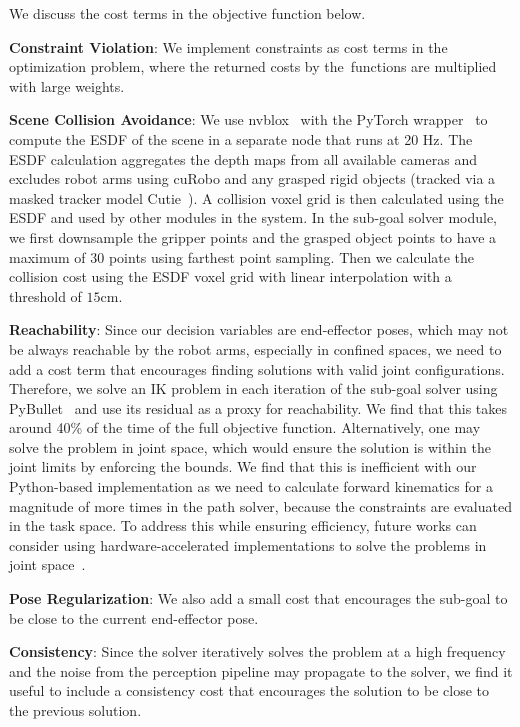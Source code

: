 We discuss the cost terms in the objective function below.

\textbf{Constraint Violation}:
We implement constraints as cost terms in the optimization problem, where the returned costs by the~\algabrvname functions are multiplied with large weights.

\textbf{Scene Collision Avoidance}:
We use nvblox~\cite{millane2023nvblox} with the PyTorch wrapper~\cite{sundaralingam2023curobo} to compute the ESDF of the scene in a separate node that runs at 20 Hz. The ESDF calculation aggregates the depth maps from all available cameras and excludes robot arms using cuRobo and any grasped rigid objects (tracked via a masked tracker model Cutie~\cite{cheng2023putting}). A collision voxel grid is then calculated using the ESDF and used by other modules in the system. In the sub-goal solver module, we first downsample the gripper points and the grasped object points to have a maximum of 30 points using farthest point sampling. Then we calculate the collision cost using the ESDF voxel grid with linear interpolation with a threshold of $15$cm.

\textbf{Reachability}:
Since our decision variables are end-effector poses, which may not be always reachable by the robot arms, especially in confined spaces, we need to add a cost term that encourages finding solutions with valid joint configurations. Therefore, we solve an IK problem in each iteration of the sub-goal solver using PyBullet~\cite{coumans2016pybullet} and use its residual as a proxy for reachability. We find that this takes around 40\% of the time of the full objective function. Alternatively, one may solve the problem in joint space, which would ensure the solution is within the joint limits by enforcing the bounds.
We find that this is inefficient with our Python-based implementation as we need to calculate forward kinematics for a magnitude of more times in the path solver, because the constraints are evaluated in the task space.
To address this while ensuring efficiency, future works can consider using hardware-accelerated implementations to solve the problems in joint space~\cite{sundaralingam2023curobo}.

\textbf{Pose Regularization}:
We also add a small cost that encourages the sub-goal to be close to the current end-effector pose.

\textbf{Consistency}:
Since the solver iteratively solves the problem at a high frequency and the noise from the perception pipeline may propagate to the solver, we find it useful to include a consistency cost that encourages the solution to be close to the previous solution.

